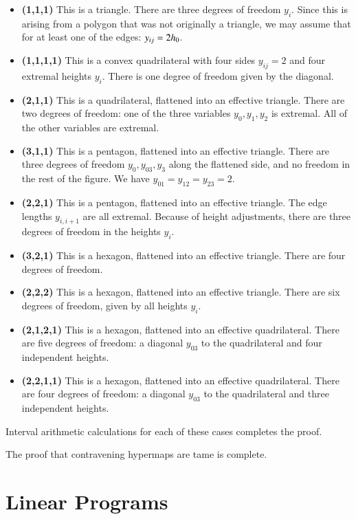 \begin{itemize}
\item {\bf (1,1,1)}  This is a triangle.  There are three degrees of
freedom $y_i$.  Since this is arising from a polygon that was not originally a triangle, we may assume that for at least one of the edges: $y_{ij}=2{h_0}$.
\item {\bf (1,1,1,1)}  This is a convex quadrilateral with four sides $y_{ij}=2$ and four extremal heights $y_i$.  There is one degree of freedom given by the diagonal.
\item {\bf (2,1,1)} This is a quadrilateral, flattened into an effective triangle.  There are two degrees of freedom: one of the three variables $y_0,y_1,y_2$ is extremal.  All of the other variables are extremal.
\item {\bf (3,1,1)}  This is a pentagon, flattened into an effective triangle.  There are three degrees of freedom $y_0,y_{03},y_3$ along the flattened side, and no freedom in the rest of the figure.  We have $y_{01}=y_{12}=y_{23}=2$.
\item {\bf (2,2,1)} This is a pentagon, flattened into an effective triangle.  The edge lengths $y_{i,i+1}$ are all extremal.  Because of height adjustments, there are three degrees of freedom in the heights $y_i$.
\item {\bf (3,2,1)} This is a hexagon, flattened into an effective triangle.  There are four degrees of freedom.
\item {\bf (2,2,2)}  This is a hexagon, flattened into an effective triangle.  There are six degrees of freedom, given by all heights $y_i$.
\item {\bf (2,1,2,1)} This is a hexagon, flattened into an effective quadrilateral.  There are five degrees of freedom: a diagonal $y_{03}$ to the quadrilateral and four independent heights.
\item {\bf (2,2,1,1)}  This is a hexagon, flattened into an effective quadrilateral.  There are four degrees of freedom: a diagonal $y_{03}$ to the quadrilateral and three independent heights.
\end{itemize}


Interval arithmetic calculations for each of these cases completes the proof.

The proof that contravening hypermaps are tame is complete.

\section{Linear Programs}

